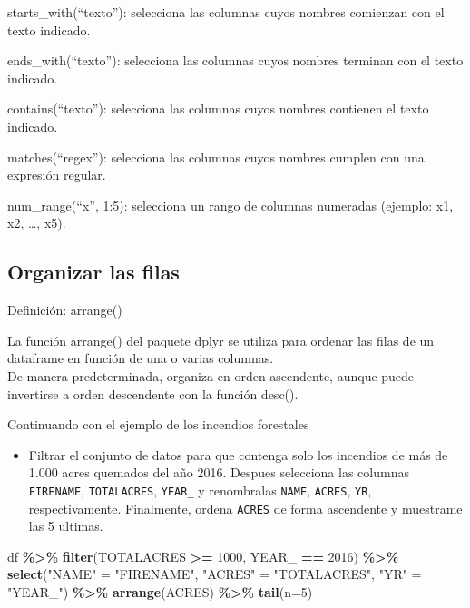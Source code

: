 \documentclass[
]{book}
\newenvironment{Shaded}{\begin{snugshade}}{\end{snugshade}}
\newcommand{\AttributeTok}[1]{\textcolor[rgb]{0.13,0.29,0.53}{#1}}
\newcommand{\DecValTok}[1]{\textcolor[rgb]{0.00,0.00,0.81}{#1}}
\newcommand{\FunctionTok}[1]{\textcolor[rgb]{0.13,0.29,0.53}{\textbf{#1}}}
\newcommand{\NormalTok}[1]{#1}
\newcommand{\OtherTok}[1]{\textcolor[rgb]{0.56,0.35,0.01}{#1}}
\newcommand{\SpecialCharTok}[1]{\textcolor[rgb]{0.81,0.36,0.00}{\textbf{#1}}}
\newcommand{\StringTok}[1]{\textcolor[rgb]{0.31,0.60,0.02}{#1}}
\providecommand{\tightlist}{%
  \setlength{\itemsep}{0pt}\setlength{\parskip}{0pt}}
\begin{document}
starts\_with(``texto''): selecciona las columnas cuyos nombres comienzan con el texto indicado.

ends\_with(``texto''): selecciona las columnas cuyos nombres terminan con el texto indicado.

contains(``texto''): selecciona las columnas cuyos nombres contienen el texto indicado.

matches(``regex''): selecciona las columnas cuyos nombres cumplen con una expresión regular.

num\_range(``x'', 1:5): selecciona un rango de columnas numeradas (ejemplo: x1, x2, \ldots, x5).

\subsection{Organizar las filas}\label{organizar-las-filas}

{} Definición: arrange()

La función arrange() del paquete dplyr se utiliza para
ordenar las filas de un dataframe en función de una o varias columnas.\\
De manera predeterminada, organiza en orden ascendente, aunque puede invertirse a
orden descendente con la función desc().

Continuando con el ejemplo de los incendios forestales

\begin{itemize}
\tightlist
\item
  Filtrar el conjunto de datos para que contenga solo los incendios de más de 1.000 acres quemados del año 2016. Despues selecciona las columnas \texttt{FIRENAME}, \texttt{TOTALACRES}, \texttt{YEAR\_} y renombralas \texttt{NAME}, \texttt{ACRES}, \texttt{YR}, respectivamente. Finalmente, ordena \texttt{ACRES} de forma ascendente y muestrame las 5 ultimas.
\end{itemize}

\begin{Shaded}
\begin{Highlighting}[]
\NormalTok{df }\SpecialCharTok{\%\textgreater{}\%} 
  \FunctionTok{filter}\NormalTok{(TOTALACRES }\SpecialCharTok{\textgreater{}=} \DecValTok{1000}\NormalTok{, YEAR\_ }\SpecialCharTok{==} \DecValTok{2016}\NormalTok{) }\SpecialCharTok{\%\textgreater{}\%} 
  \FunctionTok{select}\NormalTok{(}\StringTok{"NAME"} \OtherTok{=} \StringTok{"FIRENAME"}\NormalTok{, }\StringTok{"ACRES"} \OtherTok{=} \StringTok{"TOTALACRES"}\NormalTok{, }\StringTok{"YR"} \OtherTok{=} \StringTok{"YEAR\_"}\NormalTok{) }\SpecialCharTok{\%\textgreater{}\%}   \FunctionTok{arrange}\NormalTok{(ACRES) }\SpecialCharTok{\%\textgreater{}\%} 
  \FunctionTok{tail}\NormalTok{(}\AttributeTok{n=}\DecValTok{5}\NormalTok{)}
\end{Highlighting}
\end{Shaded}
\end{document}
